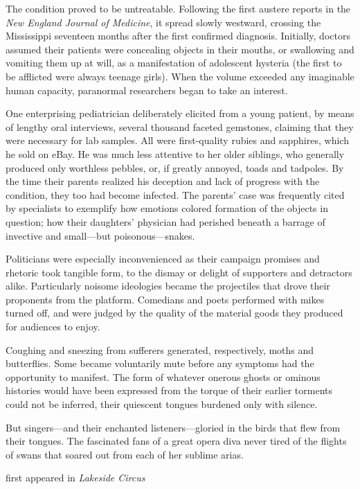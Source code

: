 
The condition proved to be untreatable. Following the first austere
reports in the \emph{New England Journal of Medicine}, it spread slowly
westward, crossing the Mississippi seventeen months after the first
confirmed diagnosis. Initially, doctors assumed their patients were
concealing objects in their mouths, or swallowing and vomiting them up
at will, as a manifestation of adolescent hysteria (the first to be
afflicted were always teenage girls). When the volume exceeded any
imaginable human capacity, paranormal researchers began to take an
interest.

One enterprising pediatrician deliberately elicited from a young
patient, by means of lengthy oral interviews, several thousand faceted
gemstones, claiming that they were necessary for lab samples. All were
first-quality rubies and sapphires, which he sold on eBay. He was much
less attentive to her older siblings, who generally produced only
worthless pebbles, or, if greatly annoyed, toads and tadpoles. By the
time their parents realized his deception and lack of progress with the
condition, they too had become infected. The parents' case was
frequently cited by specialists to exemplify how emotions colored
formation of the objects in question; how their daughters' physician had
perished beneath a barrage of invective and small---but
poisonous---snakes.

Politicians were especially inconvenienced as their campaign promises
and rhetoric took tangible form, to the dismay or delight of supporters
and detractors alike. Particularly noisome ideologies became the
projectiles that drove their proponents from the platform. Comedians and
poets performed with mikes turned off, and were judged by the quality of
the material goods they produced for audiences to enjoy.

Coughing and sneezing from sufferers generated, respectively, moths and
butterflies. Some became voluntarily mute before any symptoms had the
opportunity to manifest. The form of whatever onerous ghosts or ominous
histories would have been expressed from the torque of their earlier
torments could not be inferred, their quiescent tongues burdened only
with silence.

But singers---and their enchanted listeners---gloried in the birds that
flew from their tongues. The fascinated fans of a great opera diva never
tired of the flights of swans that soared out from each of her sublime
arias.

first appeared in \emph{Lakeside Circus}
